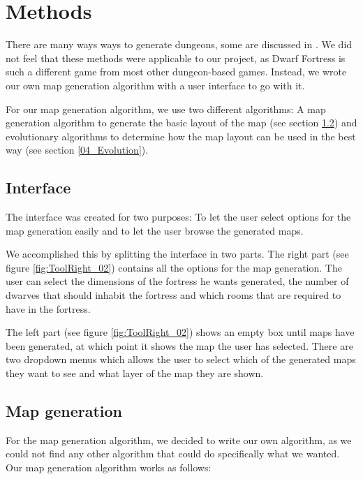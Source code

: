 \section{Methods}
\label{04}

There are many ways ways to generate dungeons, some are discussed in \cite[Chapter 3]{PCGBook}. We did not feel that these methods were applicable to our project, as Dwarf Fortress is such a different game from most other dungeon-based games. Instead, we wrote our own map generation algorithm with a user interface to go with it.

For our map generation algorithm, we use two different algorithms: A map generation algorithm to generate the basic layout of the map (see section \ref{04_MapGeneration}) and evolutionary algorithms\cite[Chapter 2]{IoEC} to determine how the map layout can be used in the best way (see section \ref{04_Evolution}).

\subsection{Interface}
\label{04_Interface}

The interface was created for two purposes: To let the user select options for the map generation easily and to let the user browse the generated maps. 

We accomplished this by splitting the interface in two parts. The right part (see figure \ref{fig:ToolRight_02}) contains all the options for the map generation. The user can select the dimensions of the fortress he wants generated, the number of dwarves that should inhabit the fortress and which rooms that are required to have in the fortress.

The left part (see figure \ref{fig:ToolRight_02}) shows an empty box until maps have been generated, at which point it shows the map the user has selected. There are two dropdown menus which allows the user to select which of the generated maps they want to see and what layer of the map they are shown.




\subsection{Map generation}
\label{04_MapGeneration}

For the map generation algorithm, we decided to write our own algorithm, as we could not find any other algorithm that could do specifically what we wanted. Our map generation algorithm works as follows:

